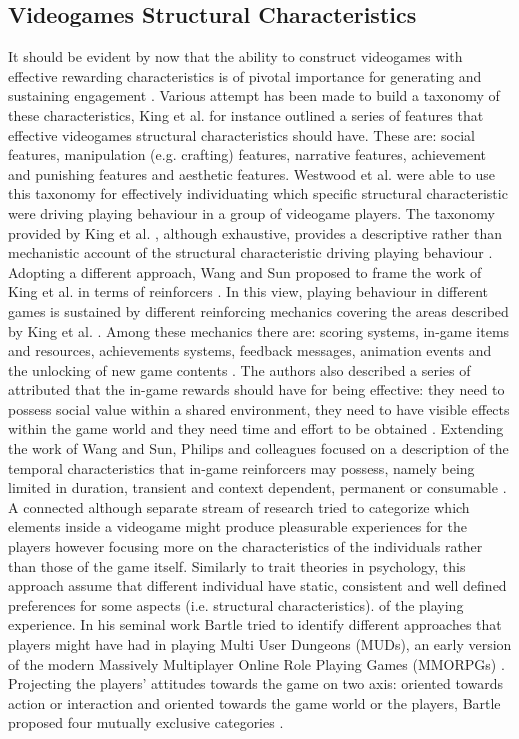 \subsection{Videogames Structural Characteristics}
\label{factors_engagement}
It should be evident by now that the ability to construct videogames with effective rewarding characteristics is of pivotal importance for generating and sustaining engagement \cite{king2010role, king2010video, yannakakis2013player}. Various attempt has been made to build a taxonomy of these characteristics, King et al. \cite{king2010video} for instance outlined a series of features that effective videogames structural characteristics should have. These are: social features, manipulation (e.g. crafting) features, narrative features, achievement and punishing features and aesthetic features. Westwood et al. \cite{westwood2010role} were able to use this taxonomy for effectively individuating which specific structural characteristic were driving playing behaviour in a group of videogame players. The taxonomy provided by King et al. \cite{king2010video}, although exhaustive, provides a descriptive rather than mechanistic account of the structural characteristic driving playing behaviour \cite{king2010role}. Adopting a different approach, Wang and Sun proposed to frame the work of King et al. in terms of reinforcers \cite{king2010video, wang2011game}. In this view, playing behaviour in different games is sustained by different reinforcing mechanics covering the areas described by King et al. \cite{king2010video, wang2011game}. Among these mechanics there are: scoring systems, in-game items and resources, achievements systems, feedback messages, animation events and the unlocking of new game contents \cite{wang2011game}. The authors also described a series of attributed that the in-game rewards should have for being effective: they need to possess social value within a shared environment, they need to have visible effects within the game world and they need time and effort to be obtained \cite{wang2011game}. Extending the work of Wang and Sun, Philips and colleagues focused on a description of the temporal characteristics that in-game reinforcers may possess, namely being limited in duration, transient and context dependent, permanent or consumable \cite{phillips2013videogame}. A connected although separate stream of research tried to categorize which elements inside a videogame might produce pleasurable experiences for the players however focusing more on the characteristics of the individuals rather than those of the game itself. Similarly to trait theories in psychology, this approach assume that different individual have static, consistent and well defined preferences for some aspects (i.e. structural characteristics). of the playing experience. In his seminal work Bartle tried to identify different approaches that players might have had in playing Multi User Dungeons (MUDs), an early version of the modern Massively Multiplayer Online Role Playing Games (MMORPGs) \cite{bartle1996hearts}. Projecting the players’ attitudes towards the game on two axis: oriented towards action or interaction and oriented towards the game world or the players, Bartle proposed four mutually exclusive categories \cite{bartle1996hearts}.
